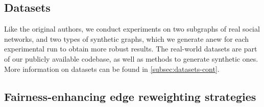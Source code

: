 \subsection{Datasets}
\label{subsec:datasets}


Like the original authors, we conduct experiments on two subgraphs of real social networks, and two types of synthetic graphs, which we generate anew for each experimental run to obtain more robust results. 
The real-world datasets are part of our publicly available codebase, as well as methods to generate synthetic ones. More information on datasets can be found in \autoref{subsec:datasets-cont}.






\subsection{Fairness-enhancing edge reweighting strategies}


